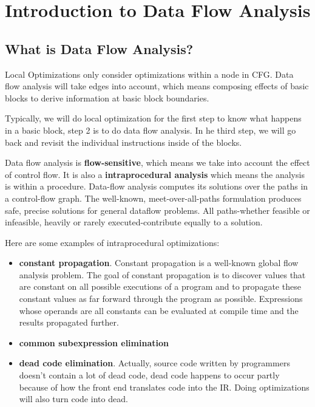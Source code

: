 \section{Introduction to Data Flow Analysis}


\subsection{What is Data Flow Analysis?}

Local Optimizations only consider optimizations within a node in CFG. 
Data flow analysis will take edges into account, which means composing 
effects of basic blocks to derive information at basic block boundaries.



Typically, we will do local optimization for the first step to know what happens in a 
basic block, step 2 is to do data flow analysis. In he third step, we will go back and 
revisit the individual instructions inside of the blocks.


Data flow analysis is \textbf{flow-sensitive}, which means we take into account
 the effect of control flow. It is also a \textbf{intraprocedural analysis} which means
 the analysis is within a procedure. Data-flow analysis computes its solutions over the paths in
 a control-flow graph. The well-known, meet-over-all-paths
 formulation produces safe, precise solutions for general dataflow problems. All paths-whether feasible or infeasible,
 heavily or rarely executed-contribute equally to a solution. 

Here are some examples of intraprocedural optimizations:

\begin{itemize}
\item \textbf{constant propagation}. Constant propagation is a well-known global flow analysis 
problem. The goal of constant propagation is to discover values that are constant on all possible 
executions of a program and to propagate these constant values as far forward through the program 
as possible. Expressions whose operands are all constants can be evaluated at compile time and the 
results propagated further.

\item \textbf{common subexpression elimination}

\item \textbf{dead code elimination}. Actually, source code written by programmers doesn't contain
 a lot of dead code, dead code happens to occur partly because of how the front end translates code into 
 the IR. Doing optimizations will also turn code into dead.

\end{itemize}




\subsection{}

